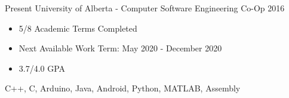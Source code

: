 
  

\begin{experiences}
    \experience
      {Present}   {University of Alberta - Computer Software Engineering Co-Op}{}{}
      {2016} {
                        \begin{itemize}
                          \item 5/8 Academic Terms Completed
                          \item Next Available Work Term: May 2020 - December 2020
			  \item 3.7/4.0 GPA
                        \end{itemize}
                      }
                      {
                        C++,
                        C,
                        Arduino,
                        Java,
                        Android,
                        Python,
                        MATLAB,
                        Assembly
                      }
  
  \end{experiences}
